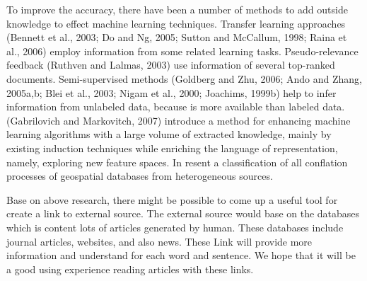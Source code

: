 \documentclass[a4paper,twocolumn]{article} %
\begin{document}
To improve the accuracy, there have been a number of methods to add outside knowledge to effect machine learning techniques. Transfer learning approaches (Bennett et al., 2003; Do and Ng, 2005; Sutton and McCallum, 1998; Raina et al., 2006) employ information from some related learning tasks. Pseudo-relevance feedback (Ruthven and Lalmas, 2003) use information of several top-ranked documents. Semi-supervised methods (Goldberg and Zhu, 2006; Ando and Zhang, 2005a,b; Blei et al., 2003; Nigam et al., 2000; Joachims, 1999b) help to infer information from unlabeled data, because is more available than labeled data. (Gabrilovich and  Markovitch, 2007) introduce a method for enhancing machine learning algorithms with a large volume of extracted knowledge, mainly by existing induction techniques while enriching the language of representation, namely, exploring new feature spaces. In \cite{Ruiz:2011:DMC:2044463.2044469} resent a classification of all conflation processes of geospatial databases from heterogeneous sources.

Base on above research, there might be possible to come up a useful tool for create a link to external source. The external source would base on the databases which is content lots of articles  generated by human. These databases include journal articles, websites, and also news. These Link will provide more information and understand for each word and sentence. We hope that it will be a good using experience reading articles with these links.
\end{document}

